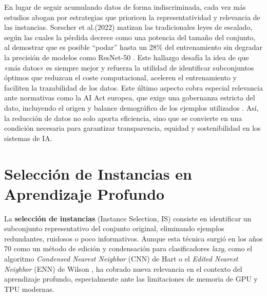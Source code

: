 En lugar de seguir acumulando datos de forma indiscriminada, cada vez más estudios abogan por estrategias que prioricen la representatividad y relevancia de las instancias.
Sorscher et al.(2022) matizan las tradicionales leyes de escalado, según las cuales la pérdida decrece como una potencia del tamaño del conjunto, al demostrar que es posible “podar” hasta un 28\% del entrenamiento sin degradar la precisión de modelos como ResNet-50 \cite{https://www.researchgate.net/publication/361632114_Beyond_neural_scaling_laws_beating_power_law_scaling_via_data_pruning}.
Este hallazgo desafía la idea de que «más datos» es siempre mejor y refuerza la utilidad de identificar subconjuntos óptimos que reduzcan el coste computacional, aceleren el entrenamiento y faciliten la trazabilidad de los datos.
Este último aspecto cobra especial relevancia ante normativas como la AI Act europea, que exige una gobernanza estricta del dato, incluyendo el origen y balance demográfico de los ejemplos utilizados \cite{https://artificialintelligenceact.eu/article/10/}.
Así, la reducción de datos no solo aporta eficiencia, sino que se convierte en una condición necesaria para garantizar transparencia, equidad y sostenibilidad en los sistemas de IA.


\section{Selección de Instancias en Aprendizaje Profundo}
La \textbf{selección de instancias} (Instance Selection, IS) consiste en identificar un subconjunto representativo del conjunto original, eliminando ejemplos redundantes, ruidosos o poco informativos.
Aunque esta técnica surgió en los años 70 como un método de edición y condensación para clasificadores \textit{lazy}, como el algoritmo \textit{Condensed Nearest Neighbor} (CNN) de Hart \cite{https://ieeexplore.ieee.org/document/1054155} o el \textit{Edited Nearest Neighbor} (ENN) de Wilson \cite{https://ieeexplore.ieee.org/document/4309137}, ha cobrado nueva relevancia en el contexto del aprendizaje profundo, especialmente ante las limitaciones de memoria de GPU y TPU modernas.

